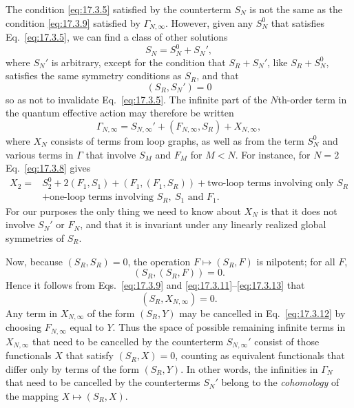 The condition \eqref{eq:17.3.5} satisfied by the counterterm $S_N$ is not the
same as the condition \eqref{eq:17.3.9} satisfied by $\Gamma_{N,\infty}$.
However, given any $S_N^0$ that satisfies Eq.~\eqref{eq:17.3.5}, we can find
a class of other solutions
\begin{equation}
S_N=S_N^0+S_N',
\label{eq:17.3.10}
\end{equation}
where $S_N'$ is arbitrary, except for the condition that $S_R+S_N'$, like
$S_R+S_N^0$, satisfies the same symmetry conditions as $S_R$, and that
\begin{equation}
(S_R,S_N')=0
\label{eq:17.3.11}
\end{equation}
so as not to invalidate Eq.~\eqref{eq:17.3.5}. The infinite part of the
$N$th-order term in the quantum effective action may therefore be written
\begin{equation}
\Gamma_{N,\infty}=S_{N,\infty}'+(F_{N,\infty},S_R)+X_{N,\infty},
\label{eq:17.3.12}
\end{equation}
where $X_N$ consists of terms from loop graphs, as well as from the term
$S_N^0$ and various terms in $\Gamma$ that involve $S_M$ and $F_M$ for
$M<N$. For instance, for $N=2$ Eq.~\eqref{eq:17.3.8} gives
\begin{align*}
X_2={}&S_2^0+2(F_1,S_1)+(F_1,(F_1,S_R))
+\text{two-loop terms involving only }S_R\\
&+\text{one-loop terms involving }S_R,\ S_1\text{ and }F_1.
\end{align*}
For our purposes the only thing we need to know about $X_N$ is that it does
not involve $S_N'$ or $F_N$, and that it is invariant under any linearly
realized global symmetries of $S_R$.

Now, because $(S_R,S_R)=0$, the operation $F\longmapsto(S_R,F)$ is
nilpotent; for all $F$,
\begin{equation}
(S_R,(S_R,F))=0.
\label{eq:17.3.13}
\end{equation}
Hence it follows from Eqs.~\eqref{eq:17.3.9} and
\eqref{eq:17.3.11}--\eqref{eq:17.3.13} that
\begin{equation}
(S_R,X_{N,\infty})=0.
\label{eq:17.3.14}
\end{equation}
Any term in $X_{N,\infty}$ of the form $(S_R,Y)$ may be cancelled in
Eq.~\eqref{eq:17.3.12} by choosing $F_{N,\infty}$ equal to $Y$. Thus the
space of possible remaining infinite terms in $X_{N,\infty}$ that need to
be cancelled by the counterterm $S_{N,\infty}'$ consist of those functionals
$X$ that satisfy $(S_R,X)=0$, counting as equivalent functionals that differ
only by terms of the form $(S_R,Y)$. In other words, the infinities in
$\Gamma_N$ that need to be cancelled by the counterterms $S_N'$ belong to
the \emph{cohomology} of the mapping $X\longmapsto(S_R,X)$.

